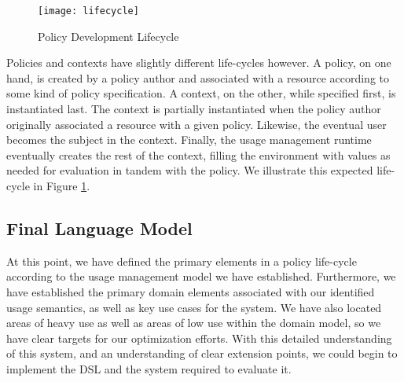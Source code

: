 \begin{figure}[!t]
\centering
\texttt{[image: lifecycle]}
\caption{Policy Development Lifecycle}
\label{fig:model:lifecycle}
\end{figure}

Policies and contexts have slightly different life-cycles however.  A policy, on one hand, is created by a policy author and associated with a resource according to some kind of policy specification.  A context, on the other, while specified first, is instantiated last.  The context is partially instantiated when the policy author originally associated a resource with a given policy.  Likewise, the eventual user becomes the subject in the context.  Finally, the usage management runtime eventually creates the rest of the context, filling the environment with values as needed for evaluation in tandem with the policy.  We illustrate this expected life-cycle in Figure \ref{fig:model:lifecycle}.

\subsection{Final Language Model}
At this point, we have defined the primary elements in a policy life-cycle according to the usage management model we have established.  Furthermore, we have established the primary domain elements associated with our identified usage semantics, as well as key use cases for the system.  We have also located areas of heavy use as well as areas of low use within the domain model, so we have clear targets for our optimization efforts.  With this detailed understanding of this system, and an understanding of clear extension points, we could begin to implement the DSL and the system required to evaluate it.